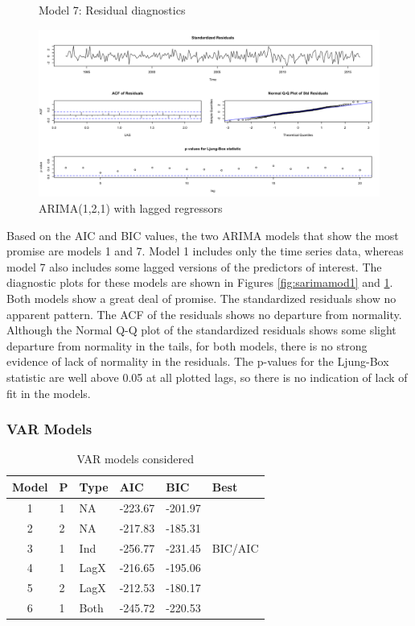 \documentclass[twoside,twocolumn]{article}
\begin{document}
    \begin{figure}[htb]
    	\centering
    	\caption{Model 7: Residual diagnostics}
     	\includegraphics[width=\linewidth]{images/sarima7}
     	\caption*{ARIMA(1,2,1) with lagged regressors}
     	\label{fig:sarimamod7}
     \end{figure}



		Based on the AIC and BIC values, the two ARIMA models that show the most promise are models 1 and 7.  Model 1 includes only the time series data, whereas model 7 also includes some lagged versions of the predictors of interest.  The diagnostic plots for these models are shown in Figures \ref{fig:sarimamod1} and \ref{fig:sarimamod7}. Both models show a great deal of promise.  The standardized residuals show no apparent pattern. The ACF of the residuals shows no departure from normality. Although the Normal Q-Q plot of the standardized residuals shows some slight departure from normality in the tails, for both models, there is no strong evidence of lack of normality in the residuals.  The p-values for the  Ljung-Box statistic are well above 0.05 at all plotted lags, so there is no indication of lack of fit in the models.


      \subsubsection{VAR Models}
\begin{table}[htb]
\centering
\caption{VAR models considered}
\label{tab:varchoices}
\begin{tabular}{clllll}
  \hline
 Model & P & Type &  AIC & BIC & Best \\
  \hline
1  & 1 & NA  &  -223.67 & -201.97 &  \\
  2  & 2 & NA  &   -217.83 & -185.31 &  \\
  3  & 1 & Ind  & -256.77 & -231.45 & BIC/AIC \\
  4  & 1 & LagX & -216.65 & -195.06 &  \\
  5  & 2 & LagX & -212.53 & -180.17 &  \\
  6  & 1 & Both  & -245.72 & -220.53 &  \\
   \hline
\end{tabular}
\end{table}
\end{document}
